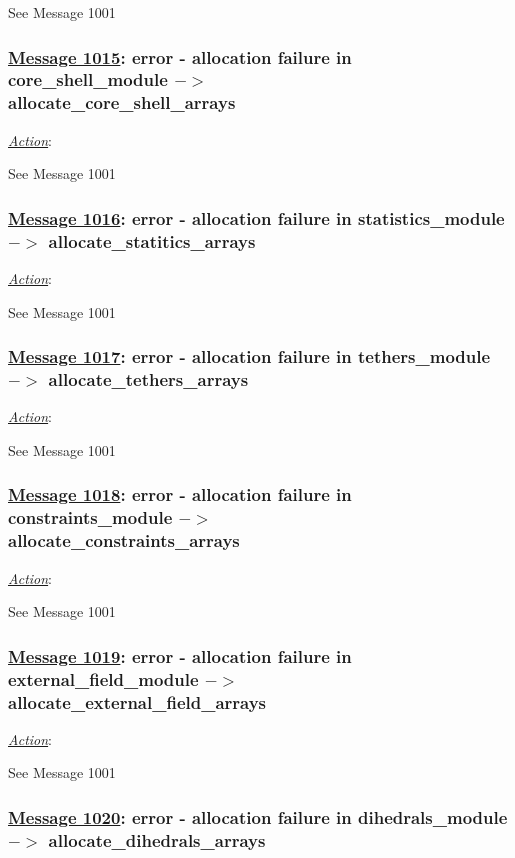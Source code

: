 See Message 1001

\subsubsection*{\underline{Message 1015}: error - allocation failure in core\_shell\_module $->$ \\
\noindent allocate\_core\_shell\_arrays}

\noindent \underline{\em Action}:

See Message 1001

\subsubsection*{\underline{Message 1016}: error - allocation failure in statistics\_module $->$ allocate\_statitics\_arrays}

\noindent \underline{\em Action}:

See Message 1001

\subsubsection*{\underline{Message 1017}: error - allocation failure in tethers\_module $->$ allocate\_tethers\_arrays}

\noindent \underline{\em Action}:

See Message 1001

\subsubsection*{\underline{Message 1018}: error - allocation failure in constraints\_module $->$ \\
\noindent allocate\_constraints\_arrays}

\noindent \underline{\em Action}:

See Message 1001

\subsubsection*{\underline{Message 1019}: error - allocation failure in external\_field\_module $->$ \\
\noindent allocate\_external\_field\_arrays}

\noindent \underline{\em Action}:

See Message 1001

\subsubsection*{\underline{Message 1020}: error - allocation failure in dihedrals\_module $->$ allocate\_dihedrals\_arrays}


